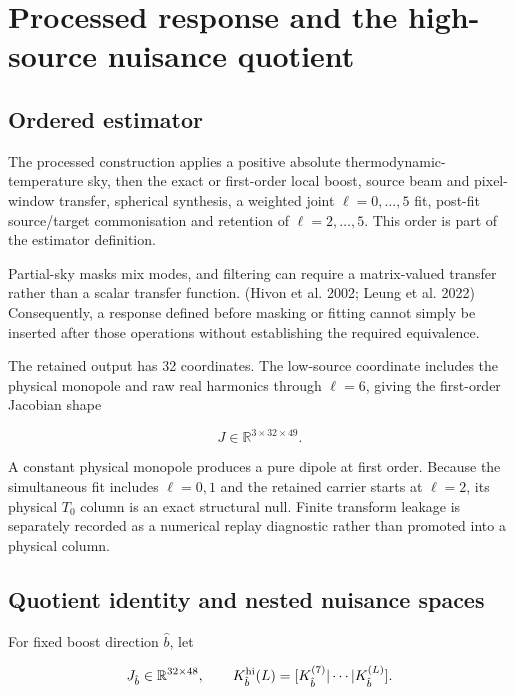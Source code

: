 \documentclass[
  11pt,
  a4paper]{article}
\begin{document}
\hypertarget{processed-response-and-the-high-source-nuisance-quotient}{%
\section{Processed response and the high-source nuisance quotient}\label{processed-response-and-the-high-source-nuisance-quotient}}

\hypertarget{ordered-estimator}{%
\subsection{Ordered estimator}\label{ordered-estimator}}

The processed construction applies a positive absolute thermodynamic-temperature sky, then the exact or first-order local boost, source beam and pixel-window transfer, spherical synthesis, a weighted joint \(\ell=0,\ldots,5\) fit, post-fit source/target commonisation and retention of \(\ell=2,\ldots,5\). This order is part of the estimator definition.

Partial-sky masks mix modes, and filtering can require a matrix-valued transfer rather than a scalar transfer function. (Hivon et al. 2002; Leung et al. 2022) Consequently, a response defined before masking or fitting cannot simply be inserted after those operations without establishing the required equivalence.

The retained output has 32 coordinates. The low-source coordinate includes the physical monopole and raw real harmonics through \(\ell=6\), giving the first-order Jacobian shape

\[
J\in\mathbb R^{3\times32\times49}.
\]

A constant physical monopole produces a pure dipole at first order. Because the simultaneous fit includes \(\ell=0,1\) and the retained carrier starts at \(\ell=2\), its physical \(T_0\) column is an exact structural null. Finite transform leakage is separately recorded as a numerical replay diagnostic rather than promoted into a physical column.

\hypertarget{quotient-identity-and-nested-nuisance-spaces}{%
\subsection{Quotient identity and nested nuisance spaces}\label{quotient-identity-and-nested-nuisance-spaces}}

For fixed boost direction \(\hat b\), let

\[
J_{\hat b}\in\mathbb R^{32\times48},
\qquad
K_{\hat b}^{\rm hi}(L)
=[K_{\hat b}^{(7)}|\cdots|K_{\hat b}^{(L)}].
\]
\end{document}
